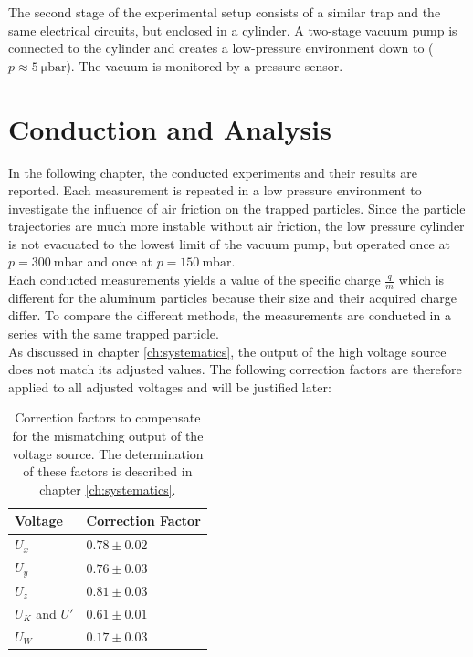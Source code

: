\documentclass[
	paper=A4,
	parskip=full,
	chapterprefix=true,
	11pt,
	headings=normal,
	bibliography=totoc,
	listof=totoc,
	titlepage=on,
]{scrreprt}
\begin{document}
The second stage of the experimental setup consists of a similar trap and the same electrical circuits, but enclosed in a cylinder. A two-stage vacuum pump is connected to the cylinder and creates a low-pressure environment down to ($p \approx \SI{5}{\micro \bar}$). The vacuum is monitored by a pressure sensor.

\chapter{Conduction and Analysis}
\label{ch:analysis}
In the following chapter, the conducted experiments and their results are reported. Each measurement is repeated in a low pressure environment to investigate the influence of air friction on the trapped particles. Since the particle trajectories are much more instable without air friction, the low pressure cylinder is not evacuated to the lowest limit of the vacuum pump, but operated once at $p = \SI{300}{\milli \bar}$ and once at $p = \SI{150}{\milli \bar}$. \\
Each conducted measurements yields a value of the specific charge $\frac{q}{m}$ which is different for the aluminum particles because their size and their acquired charge differ. To compare the different methods, the measurements are conducted in a series with the same trapped particle.\\
As discussed in chapter \ref{ch:systematics}, the output of the high voltage source does not match its adjusted values. The following correction factors are therefore applied to all adjusted voltages and will be justified later:

\begin{table}[htbp]
	\centering
	\begin{tabular}{ 
			l
			l
		}
		\toprule
		Voltage & Correction Factor \\ 
		\midrule
		$U_x$ & $0.78 \pm 0.02$  \\
		$U_y$ & $0.76 \pm 0.03$ \\
		$U_z$ & $0.81 \pm 0.03$ \\
		$U_K$ and $U'$ & $0.61 \pm 0.01$ \\
		$U_W$ & $0.17 \pm 0.03$ \\
		
		\bottomrule
	\end{tabular}
	\caption{Correction factors to compensate for the mismatching output of the voltage source. The determination of these factors is described in chapter \ref{ch:systematics}.}
	\label{tbl:corr_factors}
\end{table}
\end{document}

